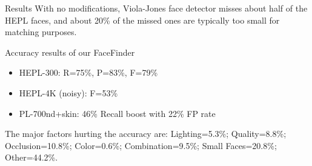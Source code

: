 
\begin{xpsectionbox}{Results}{}
With no modifications, Viola-Jones face detector misses about half of the HEPL faces, and about 20\% of the missed ones are typically too small for matching purposes.

Accuracy results of our FaceFinder
\begin{itemize}
	\item HEPL-300: R=75\%, P=83\%, F=79\%
	\item HEPL-4K (noisy): F=53\%
	\item PL-700nd+skin: 46\% Recall boost with 22\% FP rate
\end{itemize}
The major factors hurting the accuracy are: Lighting=5.3\%; Quality=8.8\%; Occlusion=10.8\%; Color=0.6\%; Combination=9.5\%; Small Faces=20.8\%; Other=44.2\%.
\end{xpsectionbox}


